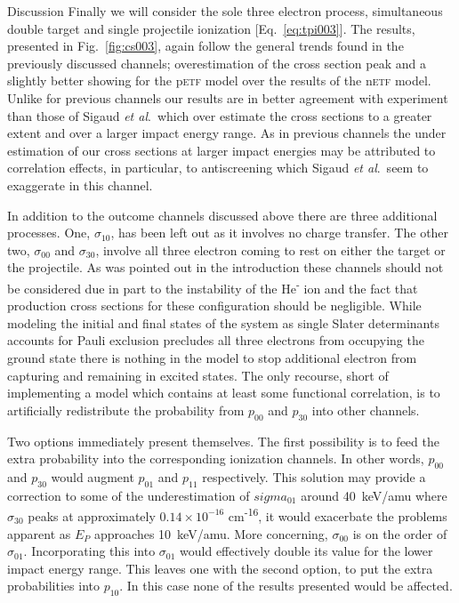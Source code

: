\documentclass[aps, pra, reprint, groupedaddress, amsfonts,
               amsmath, amssymb, showpacs, nofootinbib]{revtex4-1}
\begin{document}
\begin{section}{Discussion \label{sec:disc}}
   Finally we will consider the sole three electron process, simultaneous double target and single
   projectile ionization [Eq.~\eqref{eq:tpi003}]. The results, presented in Fig.~\ref{fig:cs003}, again
   follow the general trends found in the previously discussed channels; overestimation of the cross
   section peak and a slightly better showing for the p\textsc{etf} model over the results of the
   n\textsc{etf} model. Unlike for previous channels our results are in better agreement with experiment
   than those of Sigaud \textit{et al}.\ which over estimate the cross sections to a greater extent and
   over a larger impact energy range. As in previous channels the under estimation of our cross sections
   at larger impact energies may be attributed to correlation effects, in particular, to antiscreening
   which  Sigaud \textit{et al}.\ seem to exaggerate in this channel.

   In addition to the outcome channels discussed above there are three additional processes. One,
   $\sigma_{10}$, has been left out as it involves no charge transfer. The other two, $\sigma_{00}$ and
   $\sigma_{30}$, involve all three electron coming to rest on either the target or the projectile. As
   was pointed out in the introduction these channels should not be considered due in part to the
   instability of the He\textsuperscript{-} ion and the fact that production cross sections for these
   configuration should be negligible. While modeling the initial and final states of the system as
   single Slater determinants accounts for Pauli exclusion precludes all three electrons from occupying
   the ground state there is nothing in the model to stop additional electron from capturing and
   remaining in excited states. The only recourse, short of implementing a model which contains at least
   some functional correlation, is to artificially redistribute the probability from $p_{00}$ and
   $p_{30}$ into other channels.

   Two options immediately present themselves. The first possibility is to feed the extra probability
   into the corresponding ionization channels. In other words, $p_{00}$ and $p_{30}$ would augment
   $p_{01}$ and $p_{11}$ respectively. This solution may provide a correction to some of the
   underestimation of $sigma_{01}$ around 40~keV/amu where $\sigma_{30}$ peaks at approximately
   $0.14 \times 10^{-16}$ cm\textsuperscript{-16}, it would exacerbate the problems apparent as $E_P$
   approaches 10~keV/amu. More concerning, $\sigma_{00}$ is on the order of $\sigma_{01}$. Incorporating
   this into $\sigma_{01}$ would effectively double its value for the lower impact energy range. This
   leaves one with the second option, to put the extra probabilities into $p_{10}$. In this case none
   of the results presented would be affected.


\end{section}
\end{document}
